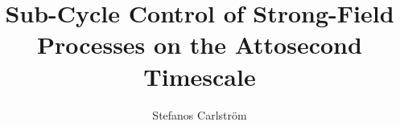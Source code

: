 \documentclass[10pt]{article}
\title{Sub-Cycle Control of Strong-Field Processes on the Attosecond Timescale}
\author{Stefanos Carlström}
\begin{document}
\fulltitledefault
\end{document}
